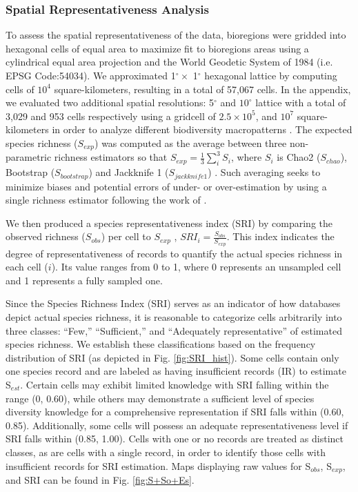 \documentclass[12pt,authoryear]{elsarticle}
\begin{document}
\subsubsection{Spatial Representativeness Analysis}
\label{sec:spat-repr-analys}
To assess the spatial representativeness of the data, bioregions were gridded into hexagonal cells of equal area to maximize fit to bioregions areas using a cylindrical equal area projection and the World Geodetic System of 1984 (i.e. EPSG Code:54034). We approximated 1$^{\circ} \times$ 1$^{\circ}$ hexagonal lattice by computing cells of $10^4$ square-kilometers, resulting in a total of  57,067 cells. In the appendix, we evaluated two additional spatial resolutions: 5$^\circ$ and $10^\circ$ lattice with a total of 3,029 and 953 cells respectively using a gridcell of $2.5\times 10^5$, and $10^7$ square-kilometers in order to analyze different biodiversity macropatterns \citep{tittensor2010global}. The expected species richness ($S_{exp}$) was computed as the average between three non-parametric richness estimators so that $S_{exp} = \frac{1}{3}\sum_i^3S_i $, where $S_i$ is Chao2 ($S_{chao}$), Bootstrap ($S_{bootstrap}$) and Jackknife 1 ($S_{jackknife1}$) \citep[see][for individual definition of indices]{magurran2011}. Such averaging seeks to minimize biases and potential errors of under- or over-estimation by using a single richness estimator following the work of \citep{mora2008completeness, troia2017}.

We then produced a species representativeness index (SRI) by comparing the observed richness ($S_{obs}$) per cell to $S_{exp}$ \citep{troia2017}, $SRI_i = \frac{S_{obs}}{S_{exp}}$. This index indicates the degree of representativeness of records to quantify the actual species richness in each cell ($i$). Its value ranges from 0 to 1, where 0 represents an unsampled cell and 1 represents a fully sampled one.


Since the Species Richness Index (SRI) serves as an indicator of how databases depict actual species richness, it is reasonable to categorize cells arbitrarily into three classes: ``Few,'' ``Sufficient,'' and ``Adequately representative'' of estimated species richness. We establish these classifications based on the frequency distribution of SRI (as depicted in Fig. \ref{fig:SRI_hist}). Some cells contain only one species record and are labeled as having insufficient records (IR) to estimate S$_{est}$. Certain cells may exhibit limited knowledge with SRI falling within the range (0, 0.60), while others may demonstrate a sufficient level of species diversity knowledge for a comprehensive representation if SRI falls within (0.60, 0.85). Additionally, some cells will possess an adequate representativeness level if SRI falls within (0.85, 1.00). Cells with one or no records are treated as distinct classes, as are cells with a single record, in order to identify those cells with insufficient records for SRI estimation. Maps displaying raw values for S$_{obs}$, S$_{exp}$, and SRI can be found in Fig. \ref{fig:S+So+Es}.
\end{document}
